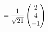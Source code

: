 \documentclass[preview]{standalone}
\begin{document}
\begin{align*}
= {1 \over \sqrt{21}} \begin{pmatrix} 2 \\ 4 \\ -1 \end{pmatrix}
\end{align*}
\end{document}
